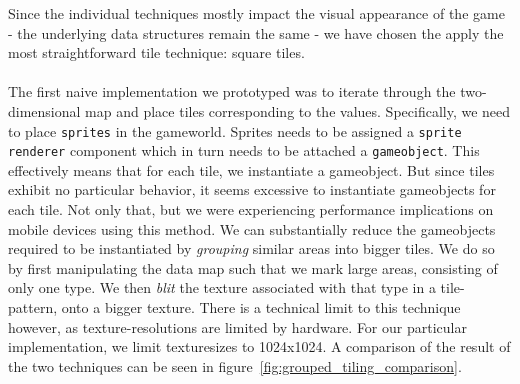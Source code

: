 Since the individual techniques mostly impact the visual appearance of the game
- the underlying data structures remain the same - we have chosen the apply the
most straightforward tile technique: square tiles.
\\
\\
The first naive implementation we prototyped was to iterate through the
two-dimensional map and place tiles corresponding to the values. Specifically,
we need to place \texttt{sprites} in the gameworld. Sprites needs to be
assigned a \texttt{sprite renderer} component which in turn needs to be
attached a \texttt{gameobject}. This effectively means that for each tile, we
instantiate a gameobject.
But since tiles exhibit no particular behavior, it seems excessive to
instantiate gameobjects for each tile. Not only that, but we were experiencing
performance implications on mobile devices using this method.  We can
substantially reduce the gameobjects required to be instantiated by
\textit{grouping} similar areas into bigger tiles. We do so by first
manipulating the data map such that we mark large areas, consisting of only one
type. We then \textit{blit} the texture associated with that type in a
tile-pattern, onto a bigger texture.  There is a technical limit to this
technique however, as texture-resolutions are limited by hardware. For our
particular implementation, we limit texturesizes to 1024x1024. A comparison of
the result of the two techniques can be seen in
figure~\ref{fig:grouped_tiling_comparison}.

